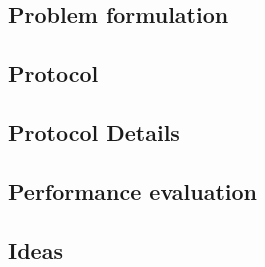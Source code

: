 \subsection{Problem formulation}

\subsection{Protocol}

\subsection{Protocol Details}


\subsection{Performance evaluation}



\subsection{Ideas}



% 
% 

